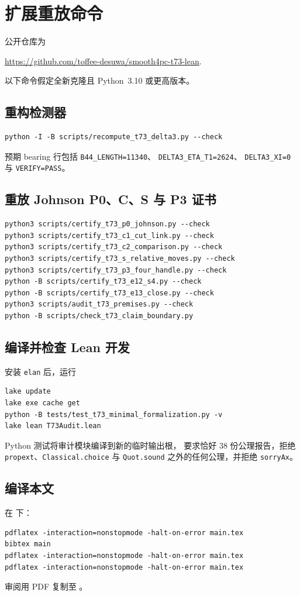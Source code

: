 \section{扩展重放命令}\label{sec:reproducibility-extended}

公开仓库为
\begin{center}
\url{https://github.com/toffee-desuwa/smooth4pc-t73-lean}.
\end{center}
以下命令假定全新克隆且 Python~3.10 或更高版本。

\subsection{重构检测器}

\begin{verbatim}
python -I -B scripts/recompute_t73_delta3.py --check
\end{verbatim}
预期 bearing 行包括
\texttt{B44\_LENGTH=11340}、
\texttt{DELTA3\_ETA\_T1=2624}、
\texttt{DELTA3\_XI=0} 与 \texttt{VERIFY=PASS}。

\subsection{重放 Johnson P0、C、S 与 P3 证书}

\begin{verbatim}
python3 scripts/certify_t73_p0_johnson.py --check
python3 scripts/certify_t73_c1_cut_link.py --check
python3 scripts/certify_t73_c2_comparison.py --check
python3 scripts/certify_t73_s_relative_moves.py --check
python3 scripts/certify_t73_p3_four_handle.py --check
python -B scripts/certify_t73_e12_s4.py --check
python -B scripts/certify_t73_e13_close.py --check
python3 scripts/audit_t73_premises.py --check
python -B scripts/check_t73_claim_boundary.py
\end{verbatim}

\subsection{编译并检查 Lean 开发}

安装 \texttt{elan} 后，运行
\begin{verbatim}
lake update
lake exe cache get
python -B tests/test_t73_minimal_formalization.py -v
lake lean T73Audit.lean
\end{verbatim}
Python 测试将审计模块编译到新的临时输出根，
要求恰好 $38$ 份公理报告，拒绝
\texttt{propext}、\texttt{Classical.choice} 与 \texttt{Quot.sound}
之外的任何公理，并拒绝 \texttt{sorryAx}。

\subsection{编译本文}

在  下：
\begin{verbatim}
pdflatex -interaction=nonstopmode -halt-on-error main.tex
bibtex main
pdflatex -interaction=nonstopmode -halt-on-error main.tex
pdflatex -interaction=nonstopmode -halt-on-error main.tex
\end{verbatim}
审阅用 PDF 复制至
。
